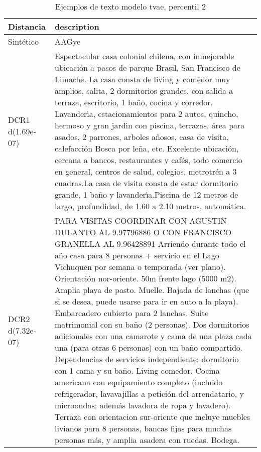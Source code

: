 \begin{table}[H]
\centering
\fontsize{10}{14}\selectfont
\caption{Ejemplos de texto modelo tvae, percentil 2}
\label{table-example-economicos-a-2-tvae-2p-text}
\begin{tabular}{|l|m{35em}|}
\hline
\rowcolor[gray]{0.8}
Distancia & description \\
\hline Sintético & AAGye \\
\hline DCR1 d(1.69e-07) & Espectacular casa colonial chilena, con inmejorable ubicaci\'on a pasos de parque Brasil, San Francisco de Limache. La casa consta de living y comedor muy amplios, salita, 2 dormitorios grandes, con salida a terraza, escritorio, 1 ba\~no, cocina y corredor. Lavander{\'\i}a, estacionamientos para 2 autos, quincho, hermoso y gran jard{\'\i}n con piscina, terrazas, \'area para asados, 2 parrones, arboles a\~nosos, casa de visita, calefacci\'on Bosca por le\~na, etc. Excelente ubicaci\'on, cercana a bancos, restaurantes y caf\'es, todo comercio en general, centros de salud, colegios, metrotr\'en a 3 cuadras.La casa de visita consta de estar dormitorio grande, 1 ba\~no y lavander{\'\i}a.Piscina de 12 metros de largo, profundidad, de 1.60 a 2.10 metros, autom\'atica. \\
\hline DCR2 d(7.32e-07) & PARA VISITAS COORDINAR CON AGUSTIN DULANTO AL 9.97796886 O CON FRANCISCO GRANELLA AL 9.96428891  Arriendo durante todo el a\~no casa para 8 personas + servicio en el Lago Vichuquen por semana o temporada (ver plano). Orientaci\'on nor-oriente. 50m frente lago (5000 m2). Amplia playa de pasto. Muelle. Bajada de lanchas (que si se desea, puede usarse para ir en auto a la playa). Embarcadero cubierto para 2 lanchas. Suite matrimonial con su ba\~no (2 personas). Dos dormitorios adicionales con una camarote y cama de una plaza cada una (para otras 6 personas) con un ba\~no compartido. Dependencias de servicios independiente: dormitorio con 1 cama y su ba\~no. Living comedor. Cocina americana con equipamiento completo (incluido refrigerador, lavavajillas a petici\'on del arrendatario, y microondas; adem\'as lavadora de ropa y lavadero). Terraza con orientacion sur-oriente que incluye muebles livianos para 8 personas, bancas fijas para muchas personas m\'as, y amplia asadera con ruedas. Bodega. \\
\hline
\end{tabular}
\end{table}

